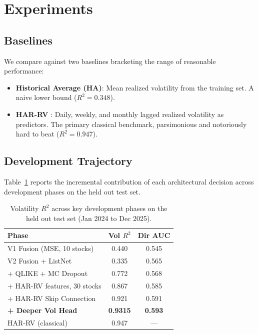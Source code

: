 \documentclass[10pt, twocolumn, a4paper]{article}
\begin{document}
\section{Experiments}
\label{sec:experiments}

\subsection{Baselines}

We compare against two baselines bracketing the range of reasonable
performance:
\begin{itemize}[noitemsep, topsep=2pt, leftmargin=*]
    \item \textbf{Historical Average (HA)}: Mean realized volatility from
    the training set. A naive lower bound ($R^2 = 0.348$).
    \item \textbf{HAR{-}RV} \citep{corsi2009simple}: Daily, weekly, and
    monthly lagged realized volatility as predictors. The primary classical
    benchmark, parsimonious and notoriously hard to beat ($R^2 = 0.947$).
\end{itemize}

\subsection{Development Trajectory}

Table~\ref{tab:phases} reports the incremental contribution of each
architectural decision across development phases on the held out test set.

\begin{table}[H]
\centering
\small
\caption{Volatility $R^2$ across key development phases on the held out
test set (Jan 2024 to Dec 2025).}
\label{tab:phases}
\begin{tabular}{lcc}
\toprule
\textbf{Phase} & \textbf{Vol $R^2$} & \textbf{Dir AUC} \\
\midrule
V1 Fusion (MSE, 10 stocks)         & 0.440 & 0.545 \\
V2 Fusion + ListNet                & 0.335 & 0.565 \\
+ QLIKE + MC Dropout               & 0.772 & 0.568 \\
+ HAR{-}RV features, 30 stocks     & 0.867 & 0.585 \\
+ HAR{-}RV Skip Connection         & 0.921 & 0.591 \\
\textbf{+ Deeper Vol Head}         & \textbf{0.9315} & \textbf{0.593} \\
\midrule
HAR{-}RV (classical)               & 0.947 & ---   \\
\bottomrule
\end{tabular}
\end{table}
\end{document}
